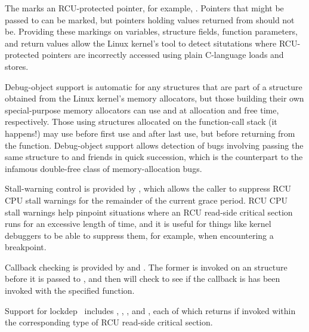 The  marks an RCU-protected pointer, for example,
.
Pointers that might be passed to  can be marked,
but pointers holding values returned from 
should not be.
Providing these markings on variables, structure fields, function
parameters, and return values allow the Linux kernel's 
tool to detect situtations where RCU-protected pointers are
incorrectly accessed using plain C-language loads and stores.

Debug-object support is automatic for any  structures
that are part of a structure obtained from the Linux kernel's
memory allocators, but those building their own special-purpose
memory allocators can use  and 
at allocation and free time, respectively.
Those using  structures allocated on the function-call
stack (it happens!) may use 
before first use and  after last use,
but before returning from the function.
Debug-object support allows detection of bugs involving passing the
same  structure to  and friends in
quick succession, which is the  counterpart to the
infamous double-free class of memory-allocation bugs.

Stall-warning control is provided by , which
allows the caller to suppress RCU CPU stall warnings for the remainder
of the current grace period.
RCU CPU stall warnings help pinpoint situations where an RCU read-side
critical section runs for an excessive length of time, and it is useful
for things like kernel debuggers to be able to suppress them, for example,
when encountering a breakpoint.

Callback checking is provided by  and
.
The former is invoked on an  structure before it is passed
to , and then  will
check to see if the callback is has been invoked with the specified
function.

Support for lockdep~\cite{JonathanCorbet2006lockdep} includes
,
,
, and
,
each of which returns  if invoked within the corresponding
type of RCU read-side critical section.

\QuickQuizEnd

